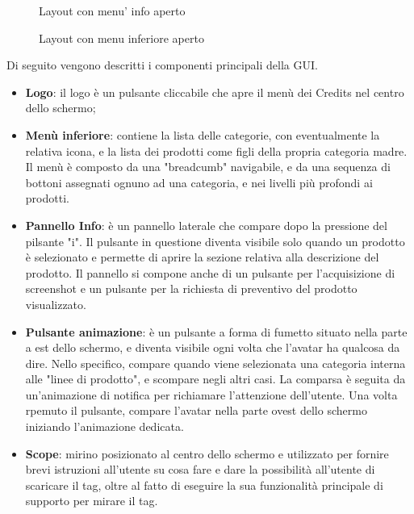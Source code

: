 \begin{figure}[H]
	\centering
	\caption{Layout con menu' info aperto}
	\label{fig:Layout con menu info aperto}
\end{figure}

\begin{figure}[H]
	\centering
	\caption{Layout con menu inferiore aperto}
	\label{fig:Layout con menu inferiore aperto}
\end{figure}
\newpage
Di seguito vengono descritti i componenti principali della GUI.

\begin{itemize}
	\item \textbf{Logo}: il logo \`e un pulsante cliccabile che apre il men\`u dei Credits nel centro dello schermo;
	\item \textbf{Men\`u inferiore}: contiene la lista delle categorie, con eventualmente la relativa icona, e la lista dei prodotti come figli della propria categoria madre. Il men\`u \`e composto da una "breadcumb" navigabile, e da una sequenza di bottoni assegnati ognuno ad una categoria, e nei livelli pi\`u profondi ai prodotti.
	\item \textbf{Pannello Info}: \`e un pannello laterale che compare dopo la pressione del pilsante "i". Il pulsante in questione diventa visibile solo quando un prodotto \`e selezionato e permette di aprire la sezione relativa alla descrizione del prodotto. Il pannello si compone anche di un pulsante per l'acquisizione di screenshot e un pulsante per la richiesta di preventivo del prodotto visualizzato.
	\item \textbf{Pulsante animazione}: \`e un pulsante a forma di fumetto situato nella parte a est dello schermo, e diventa visibile ogni volta che l'avatar ha qualcosa da dire. Nello specifico, compare quando viene selezionata una categoria interna alle "linee di prodotto", e scompare negli altri casi. La comparsa \`e seguita da un'animazione di notifica per richiamare l'attenzione dell'utente. Una volta rpemuto il pulsante, compare l'avatar nella parte ovest dello schermo iniziando l'animazione dedicata.
	\item \textbf{Scope}: mirino posizionato al centro dello schermo e utilizzato per fornire brevi istruzioni all'utente su cosa fare e dare la possibilit\`a all'utente di scaricare il tag, oltre al fatto di eseguire la sua funzionalit\`a principale di supporto per mirare il tag.
\end{itemize}


